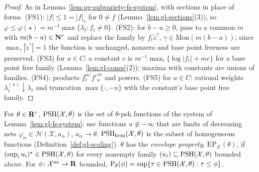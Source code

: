 \begin{proof}
As in Lemma~\ref{lem:pg-subvariety-fs-system}, with sections in place of forms. (FS1): $|f|\le1=|f|_\star$ for $0\ne f$ (Lemma~\ref{lem:gl-sections}(3)),
so $\varphi\le\varphi(\star)=m^{-1}\max\{\lambda_t:f_t\ne0\}$. (FS2): for $b-a\ge0$, pass to a common $m$ with $m(b-a)\in\mathbf{N}^r$ and replace the family by
$f_t\tilde z^\gamma$, $\gamma\in\mathrm{Mon}(m(b-a))$; since $\max_\gamma|\tilde z^\gamma|=1$ the function is unchanged, nonzero and base point freeness
are preserved. (FS3) for $a\in C$: a constant $c$ is $m^{-1}\max_t\{\log|f_t|+mc\}$ for a base point free family (Lemma~\ref{lem:gl-cones}(2));
maxima with constants are unions of families. (FS4): products $f_t^{m'}f'^{\,m}_u$ and powers. (FS5) for $a\in C$: rational weights
$\lambda^{(n)}_t\downarrow\lambda_t$ and truncation $\max\{\cdot,-n\}$ with the constant's base point free family.
\end{proof}

\begin{definition}\label{def:gl-psh}
\leanok
{}
For $\theta\in\mathbf{R}^r$, $\operatorname{PSH}(\mathcal X,\theta)$ is the set of $\theta$-psh functions of the system of Lemma~\ref{lem:gl-fs-system}:
usc functions $u\not\equiv-\infty$ that are limits of decreasing nets $\varphi_\alpha\in\mathcal H(\mathcal X,a_\alpha)$, $a_\alpha\to\theta$.
$\operatorname{PSH}_{\mathrm{hom}}(\mathcal X,\theta)$ is the subset of homogeneous functions (Definition~\ref{def:gl-scaling}). $\theta$ has the
\emph{envelope property}, $\mathrm{EP}_{\mathcal X}(\theta)$, if $(\sup_iu_i)^\star\in\operatorname{PSH}(\mathcal X,\theta)$ for every nonempty family
$(u_i)\subseteq\operatorname{PSH}(\mathcal X,\theta)$ bounded above. For $\phi\colon\mathcal X^{\mathrm{an}}\to\mathbf{R}$ bounded, $\mathrm P_\theta(\phi)=\sup\{\tau\in
\operatorname{PSH}(\mathcal X,\theta):\tau\le\phi\}$.
\end{definition}

